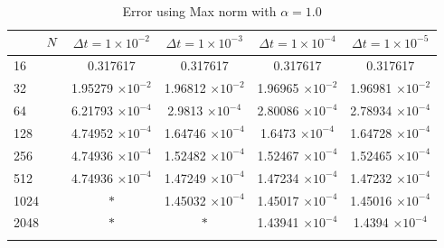 \begin{table}[H]
\begin{tabular}{lcccc}
			$\hspace{9mm}N$ & $\Delta t=1\times 10^{-2}$ & $\Delta t=1\times 10^{-3}$ & $\Delta t=1\times 10^{-4}$ & $\Delta t=1\times 10^{-5}$ \\
			\midrule
			\hspace{7mm} 16 & 0.317617    & 0.317617    & 0.317617    & 0.317617    \\
			\midrule
			\hspace{7mm} 32 & 1.95279 $\times 10 ^{-2}$  & 1.96812 $\times 10 ^{-2}$   & 1.96965 $\times 10 ^{-2}$   & 1.96981 $\times 10 ^{-2}$   \\
			\midrule
			\hspace{7mm} 64 & 6.21793 $\times 10 ^{-4}$ & 2.9813 $\times 10 ^{-4}$  & 2.80086 $\times 10 ^{-4}$ & 2.78934 $\times 10 ^{-4}$ \\
			\midrule
			\hspace{7mm} 128 & 4.74952 $\times 10 ^{-4}$ & 1.64746 $\times 10 ^{-4}$ & 1.6473 $\times 10 ^{-4}$  & 1.64728 $\times 10 ^{-4}$ \\
			\midrule
			\hspace{7mm} 256 & 4.74936 $\times 10 ^{-4}$ & 1.52482 $\times 10 ^{-4}$ & 1.52467 $\times 10 ^{-4}$ & 1.52465 $\times 10 ^{-4}$ \\
			\midrule
			\hspace{7mm} 512 & 4.74936 $\times 10 ^{-4}$ & 1.47249 $\times 10 ^{-4}$ & 1.47234 $\times 10 ^{-4}$ & 1.47232 $\times 10 ^{-4}$ \\
			\midrule
			\hspace{7mm} 1024 & $\ast$           & 1.45032 $\times 10 ^{-4}$ & 1.45017 $\times 10 ^{-4}$ & 1.45016 $\times 10 ^{-4}$ \\
			\midrule
			\hspace{7mm} 2048 & $\ast$           & $\ast$           & 1.43941 $\times 10 ^{-4}$ & 1.4394 $\times 10 ^{-4}$ \\
			\\
			\bottomrule
		\end{tabular}
		\caption{Error using Max norm with $\alpha=1.0$}
		\label{Collocation_tabla_max_alpha=1}
	\end{table}
	
